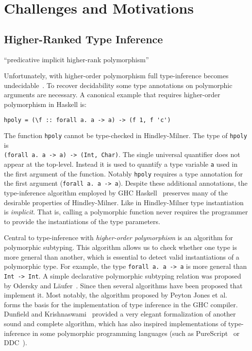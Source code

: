 \section{Challenges and Motivations}

\subsection{Higher-Ranked Type Inference}

``predicative implicit higher-rank polymorphism''

Unfortunately, with higher-order polymorphism full type-inference becomes
undecidable~\cite{wells1999typability}. To recover decidability some type annotations 
on polymorphic arguments
are necessary. 
A canonical example that requires higher-order polymorphism in Haskell is:
\begin{verbatim}
hpoly = (\f :: forall a. a -> a) -> (f 1, f 'c')
\end{verbatim}
The function \verb|hpoly| cannot be
type-checked in Hindley-Milner.  The type of \verb|hpoly| is \\
\verb|(forall a. a -> a) -> (Int, Char)|. The single universal quantifier
does not appear at the top-level. Instead it is used to quantify a
type variable \verb|a| used in the first argument of the
function.
Notably \verb|hpoly| requires a type annotation for the first
argument (\verb|forall a. a -> a|). 
Despite these additional annotations,
the type-inference algorithm employed by GHC Haskell~\cite{jones2007practical} preserves 
many of the desirable properties of Hindley-Milner. 
Like in Hindley-Milner type instantiation is \emph{implicit}. That is,
calling a polymorphic function never requires the programmer to 
provide the instantiations of the type parameters.

Central to type-inference with \emph{higher-order polymorphism} is an
algorithm for polymorphic subtyping. 
This algorithm
allows us to check whether one type is more general than another,
which is essential to detect valid instantiations of a polymorphic
type. For example, the type \verb|forall a. a -> a| is more
general than \verb|Int -> Int|. 
A simple declarative polymorphic subtyping relation
was proposed by Odersky and L\"aufer~\cite{odersky1996putting}. Since then several
algorithms have been proposed that implement it. Most
notably, the algorithm proposed by Peyton Jones et al.~\cite{jones2007practical} forms the basis
for the implementation of type inference in the GHC compiler. 
Dunfield and Krishnaswami~\cite{dunfield2013complete} provided a very elegant
formalization of another sound and complete algorithm, which has 
also inspired implementations of type-inference in some polymorphic 
programming languages (such as PureScript~\cite{PureScript} or DDC~\cite{Disciple}).

